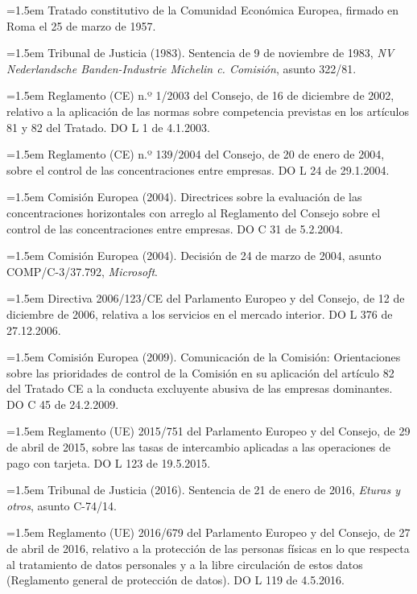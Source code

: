 \documentclass[10pt,a4paper]{article}
\begin{document}
\noindent\hangindent=1.5em Tratado constitutivo de la Comunidad Económica Europea, firmado en Roma el 25 de marzo de 1957.

\noindent\hangindent=1.5em Tribunal de Justicia (1983). Sentencia de 9 de noviembre de 1983, \textit{NV Nederlandsche Banden-Industrie Michelin c. Comisión}, asunto 322/81.

\noindent\hangindent=1.5em Reglamento (CE) n.º 1/2003 del Consejo, de 16 de diciembre de 2002, relativo a la aplicación de las normas sobre competencia previstas en los artículos 81 y 82 del Tratado. DO L 1 de 4.1.2003.

\noindent\hangindent=1.5em Reglamento (CE) n.º 139/2004 del Consejo, de 20 de enero de 2004, sobre el control de las concentraciones entre empresas. DO L 24 de 29.1.2004.

\noindent\hangindent=1.5em Comisión Europea (2004). Directrices sobre la evaluación de las concentraciones horizontales con arreglo al Reglamento del Consejo sobre el control de las concentraciones entre empresas. DO C 31 de 5.2.2004.

\noindent\hangindent=1.5em Comisión Europea (2004). Decisión de 24 de marzo de 2004, asunto COMP/C-3/37.792, \textit{Microsoft}.

\noindent\hangindent=1.5em Directiva 2006/123/CE del Parlamento Europeo y del Consejo, de 12 de diciembre de 2006, relativa a los servicios en el mercado interior. DO L 376 de 27.12.2006.

\noindent\hangindent=1.5em Comisión Europea (2009). Comunicación de la Comisión: Orientaciones sobre las prioridades de control de la Comisión en su aplicación del artículo 82 del Tratado CE a la conducta excluyente abusiva de las empresas dominantes. DO C 45 de 24.2.2009.

\noindent\hangindent=1.5em Reglamento (UE) 2015/751 del Parlamento Europeo y del Consejo, de 29 de abril de 2015, sobre las tasas de intercambio aplicadas a las operaciones de pago con tarjeta. DO L 123 de 19.5.2015.

\noindent\hangindent=1.5em Tribunal de Justicia (2016). Sentencia de 21 de enero de 2016, \textit{Eturas y otros}, asunto C-74/14.

\noindent\hangindent=1.5em Reglamento (UE) 2016/679 del Parlamento Europeo y del Consejo, de 27 de abril de 2016, relativo a la protección de las personas físicas en lo que respecta al tratamiento de datos personales y a la libre circulación de estos datos (Reglamento general de protección de datos). DO L 119 de 4.5.2016.
\end{document}
